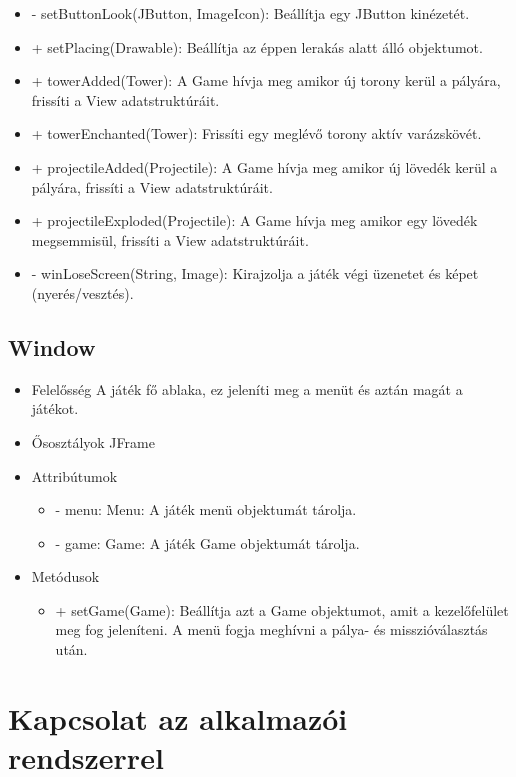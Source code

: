 \begin{itemize}
\begin{itemize}
		\item - setButtonLook(JButton, ImageIcon): Beállítja egy JButton kinézetét.
		\item + setPlacing(Drawable): Beállítja az éppen lerakás alatt álló objektumot.
		\item + towerAdded(Tower): A Game hívja meg amikor új torony kerül a pályára, frissíti a View adatstruktúráit.
		\item + towerEnchanted(Tower): Frissíti egy meglévő torony aktív varázskövét.
		\item + projectileAdded(Projectile): A Game hívja meg amikor új lövedék kerül a pályára, frissíti a View adatstruktúráit.
		\item + projectileExploded(Projectile): A Game hívja meg amikor egy lövedék megsemmisül, frissíti a View adatstruktúráit.
		\item - winLoseScreen(String, Image): Kirajzolja a játék végi üzenetet és képet (nyerés/vesztés).
	\end{itemize}
\end{itemize}

\subsection{Window}
\begin{itemize}
\item Felelősség \newline
A játék fő ablaka, ez jeleníti meg a menüt és aztán magát a játékot.
\item Ősosztályok\newline
JFrame
\item Attribútumok
	\begin{itemize}
		\item - menu: Menu: A játék menü objektumát tárolja.
		\item - game: Game: A játék Game objektumát tárolja.
	\end{itemize}
\item Metódusok
	\begin{itemize}
		\item + setGame(Game): Beállítja azt a Game objektumot, amit a kezelőfelület meg fog jeleníteni. A menü fogja meghívni a pálya- és misszióválasztás után.
	\end{itemize}
\end{itemize}

\section{Kapcsolat az alkalmazói rendszerrel}

